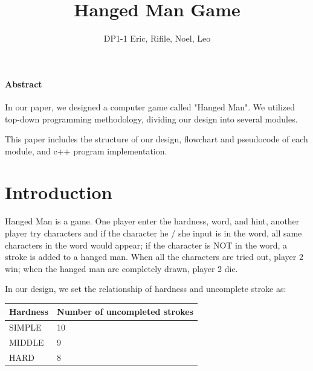 \documentclass{article}
\title{Hanged Man Game}
\author{DP1-1 Eric, Rifile, Noel, Leo}
\begin{document}
    \setlength{\parindent}{0em}

    \maketitle
    \paragraph{Abstract}
    In our paper, we designed a computer game called "Hanged Man". We utilized top-down programming methodology, dividing our design into several modules. 
    
    This paper includes the structure of our design, flowchart and pseudocode of each module, and c++ program implementation.

    \newpage

    \tableofcontents
    \newpage

    \section{Introduction}
        Hanged Man is a game. One player enter the hardness, word, and hint, another player try characters and if the character he / she input is in the word, all same characters in the word would appear; if the character is NOT in the word, a stroke is added to a hanged man. When all the characters are tried out, player 2 win; when the hanged man are completely drawn, player 2 die.

        In our design, we set the relationship of hardness and uncomplete stroke as:
        
        \begin{table}[h]
            \begin{center}
                \begin{tabular}{|l|l|}
                    \hline
                    Hardness & Number of uncompleted strokes \\ \hline
                    SIMPLE & 10 \\ \hline
                    MIDDLE & 9 \\ \hline
                    HARD & 8 \\ \hline
                \end{tabular}
            \end{center}
        \end{table}
        
\end{document}
